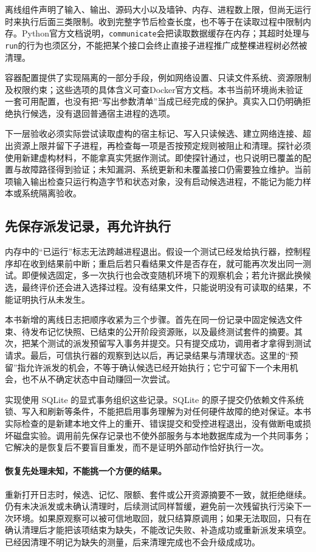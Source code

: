 离线组件声明了输入、输出、源码大小以及墙钟、内存、进程数上限，但尚无运行时来执行后面三类限制。收到完整字节后检查长度，也不等于在读取过程中限制内存。Python官方文档说明，\texttt{communicate}会把读取数据缓存在内存；其超时处理与\texttt{run}的行为也须区分，不能把某个接口会终止直接子进程推广成整棵进程树必然被清理\cite{python-subprocess-docs}。

容器配置提供了实现隔离的一部分手段，例如网络设置、只读文件系统、资源限制及权限约束；这些选项的具体含义可查Docker官方文档\cite{docker-run-security-docs}。本书当前环境尚未验证一套可用配置，也没有把“写出参数清单”当成已经完成的保护。真实入口仍明确拒绝执行候选，没有退回普通宿主进程的选项。

下一层验收必须实际尝试读取虚构的宿主标记、写入只读候选、建立网络连接、超出资源上限并留下子进程，再检查每一项是否按预定规则被阻止和清理。探针必须使用新建虚构材料，不能拿真实凭据作测试。即使探针通过，也只说明已覆盖的配置与故障路径得到验证；未知漏洞、系统更新和未覆盖接口仍需要独立维护。当前项输入输出检查只运行构造字节和状态对象，没有启动候选进程，不能记为能力样本或系统隔离验收。

\subsection{先保存派发记录，再允许执行}

内存中的“已运行”标志无法跨越进程退出。假设一个测试已经发给执行器，控制程序却在收到结果前中断；重启后若只看结果文件是否存在，就可能再次发出同一测试。即便候选固定，多一次执行也会改变随机环境下的观察机会；若允许据此换候选，最终评价还会进入选择过程。没有结果文件，只能说明没有可读取的结果，不能证明执行从未发生。

本书新增的离线日志把顺序收紧为三个步骤。首先在同一份记录中固定候选文件束、待发布记忆快照、已结束的公开阶段资源账，以及最终测试套件的摘要。其次，把某个测试的派发预留写入事务并提交。只有提交成功，调用者才拿得到测试请求。最后，可信执行器的观察到达以后，再记录结果与清理状态。这里的“预留”指允许派发的机会，不等于确认候选已经开始执行；它宁可留下一个未用机会，也不从不确定状态中自动赚回一次尝试。

实现使用 SQLite 的显式事务组织这些记录。SQLite 的原子提交仍依赖文件系统锁、写入和刷新等条件，不能把启用事务理解为对任何硬件故障的绝对保证\cite{sqlite-atomic-commit}。本书实际检查的是新建本地文件上的重开、错误提交和受控进程退出，没有做断电或损坏磁盘实验。调用前先保存记录也不使外部服务与本地数据库成为一个共同事务；它解决的是恢复后不要盲目重发，而不是证明外部动作恰好执行一次。

\paragraph{恢复先处理未知，不能挑一个方便的结果。}
重新打开日志时，候选、记忆、限额、套件或公开资源摘要不一致，就拒绝继续。仍有未决派发或未确认清理时，后续测试同样暂缓，避免前一次残留执行污染下一次环境。如果原观察可以被可信地取回，就只结算原调用；如果无法取回，只有在确认清理后才能把该项结束为缺失，不能改记失败、补造成功或重新派发来填空。已经因清理不明记为缺失的测量，后来清理完成也不会升级成成功。

